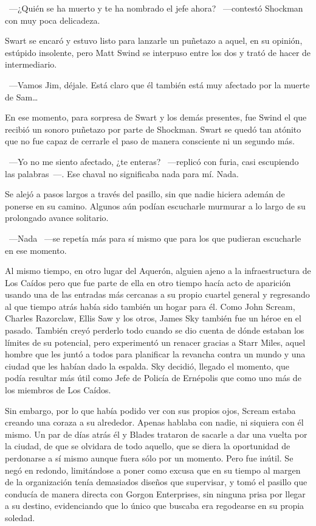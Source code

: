 ~---¿Quién se ha muerto y te ha nombrado el jefe ahora? ~---contestó Shockman con muy poca delicadeza.

Swart se encaró y estuvo listo para lanzarle un puñetazo a aquel, en su opinión, estúpido insolente, pero Matt Swind se interpuso entre los dos y trató de hacer de intermediario.

~---Vamos Jim, déjale. Está claro que él también está muy afectado por la muerte de Sam\dots

En ese momento, para sorpresa de Swart y los demás presentes, fue Swind el que recibió un sonoro puñetazo por parte de Shockman. Swart se quedó tan atónito que no fue capaz de cerrarle el paso de manera consciente ni un segundo más.

~---Yo no me siento afectado, ¿te enteras? ~---replicó con furia, casi escupiendo las palabras~---. Ese chaval no significaba nada para mí. Nada.

Se alejó a pasos largos a través del pasillo, sin que nadie hiciera ademán de ponerse en su camino. Algunos aún podían escucharle murmurar a lo largo de su prolongado avance solitario.

~---Nada ~---se repetía más para sí mismo que para los que pudieran escucharle en ese momento.

\parbreak
Al mismo tiempo, en otro lugar del Aquerón, alguien ajeno a la infraestructura de Los Caídos pero que fue parte de ella en otro tiempo hacía acto de aparición usando una de las entradas más cercanas a su propio cuartel general y regresando al que tiempo atrás había sido también un hogar para él. Como John Scream, Charles Razorclaw, Ellis Saw y los otros, James Sky también fue un héroe en el pasado. También creyó perderlo todo cuando se dio cuenta de dónde estaban los límites de su potencial, pero experimentó un renacer gracias a Starr Miles, aquel hombre que les juntó a todos para planificar la revancha contra un mundo y una ciudad que les habían dado la espalda. Sky decidió, llegado el momento, que podía resultar más útil como Jefe de Policía de Ernépolis que como uno más de los miembros de Los Caídos.

Sin embargo, por lo que había podido ver con sus propios ojos, Scream estaba creando una coraza a su alrededor. Apenas hablaba con nadie, ni siquiera con él mismo. Un par de días atrás él y Blades trataron de sacarle a dar una vuelta por la ciudad, de que se olvidara de todo aquello, que se diera la oportunidad de perdonarse a sí mismo aunque fuera sólo por un momento. Pero fue inútil. Se negó en redondo, limitándose a poner como excusa que en su tiempo al margen de la organización tenía demasiados diseños que supervisar, y tomó el pasillo que conducía de manera directa con Gorgon Enterprises, sin ninguna prisa por llegar a su destino, evidenciando que lo único que buscaba era regodearse en su propia soledad.

